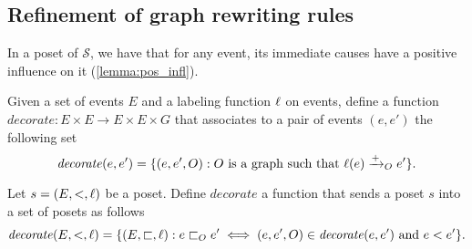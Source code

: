 

\subsection{Refinement of graph rewriting rules}

In a poset of $\mathcal{S}$, we have that for any event, its immediate causes have a positive influence on it (\autoref{lemma:pos_infl}).

\begin{definition}
   Given a set of events $E$ and a labeling function $\ell$ on events, define a function $\mathit{decorate}:E\times E \to E\times E\times G$ that associates to a pair of events $(e,e')$ the following set
    \[
    \mathit{decorate}(e,e') = \{(e,e',O) : O\text{ is a graph such that }\ell(e)\mathrel{\xrightarrow{+}}_O e'\}.
    \]

    Let $s = (E,<,\ell)$ be a poset. Define $\mathit{decorate}$ a function that sends a poset $s$ into a set of posets as follows
    \[
    \mathit{decorate}(E,<,\ell) =\{(E,\sqsubset,\ell) : e\sqsubset_O e' \iff (e,e',O)\in\mathit{decorate}(e,e')\text{ and }
    e<e'\}.
    \]
\end{definition}

